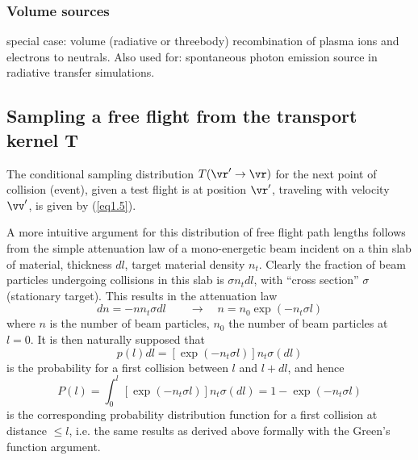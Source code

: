 \subsubsection{Volume sources}
special case: volume (radiative or threebody) recombination of plasma ions and electrons to neutrals.
Also used for: spontaneous photon emission source in radiative transfer simulations.

\subsection{Sampling a free flight from the transport kernel T} \label{sec1.2.3}
The conditional sampling distribution $T(\vr'\rightarrow \vr)$ for the next point of collision (event), given a test flight
is at position $\vr'$, traveling with velocity $\vv'$, is given by (\ref{eq1.5}).

A more intuitive argument for this distribution of free flight path lengths follows from the
simple attenuation law of a mono-energetic beam incident on a thin slab of material, thickness $dl$,
target material density $n_t$. Clearly the fraction of beam particles undergoing collisions in this slab
is $\sigma n_t dl$, with ``cross section'' $\sigma$ (stationary target). This  results in the attenuation law
\begin{equation}
dn = -n n_t  \sigma dl \quad \quad \rightarrow \quad n = n_0 \exp(-n_t \sigma l)
\end{equation}
where $n$ is the number of beam particles, $n_0$ the number of beam particles at $l=0$.
It is then naturally supposed that
\begin{equation}
p(l)dl = [\exp(-n_t\sigma l)]n_t\sigma (dl)
\end{equation}
is the probability for a first collision between $l$ and $l+dl$,
and hence
\begin{equation}
P(l) = \int_0^l [\exp(-n_t\sigma l)]n_t\sigma (dl) = 1 - \exp(-n_t \sigma l)
\end{equation}
is the corresponding probability distribution function for a first collision at distance $\le l$,
i.e. the same results as derived
above formally with the Green's function argument.

